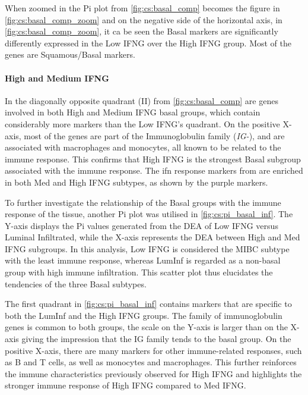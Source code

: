 When zoomed in the Pi plot from \cref{fig:cs:basal_comp} becomes the figure in \cref{fig:cs:basal_comp_zoom} and on the negative side of the horizontal axis, in \cref{fig:cs:basal_comp_zoom}, it ca be seen the Basal markers are significantly differently expressed in the Low IFNG over the High IFNG group. Most of the genes are Squamous/Basal markers.

\paragraph*{High and Medium IFNG}

In the diagonally opposite quadrant (II) from \cref{fig:cs:basal_comp} are genes involved in both High and Medium IFNG basal groups, which contain considerably more markers than the Low IFNG's quadrant. On the positive X-axis, most of the genes are part of the Immunoglobulin family (\textit{IG-}), and are associated with macrophages and monocytes, all known to be related to the immune response. This confirms that High IFNG is the strongest Basal subgroup associated with the immune response. The \acrshort{ifn} response markers from \citet{Baker2022-bj} are enriched in both Med and High IFNG subtypes, as shown by the purple markers.


To further investigate the relationship of the Basal groups with the immune response of the tissue, another Pi plot was utilised in \cref{fig:cs:pi_basal_inf}. The Y-axis displays the Pi values generated from the DEA of Low IFNG versus Luminal Infiltrated, while the X-axis represents the DEA between High and Med IFNG subgroups. In this analysis, Low IFNG is considered the MIBC subtype with the least immune response, whereas LumInf is regarded as a non-basal group with high immune infiltration. This scatter plot thus elucidates the tendencies of the three Basal subtypes.

The first quadrant in \cref{fig:cs:pi_basal_inf} contains markers that are specific to both the LumInf and the High IFNG groups. The family of immunoglobulin genes is common to both groups, the scale on the Y-axis is larger than on the X-axis giving the impression that the IG family tends to the basal group. On the positive X-axis, there are many markers for other immune-related responses, such as B and T cells, as well as monocytes and macrophages. This further reinforces the immune characteristics previously observed for High IFNG and highlights the stronger immune response of High IFNG compared to Med IFNG.



